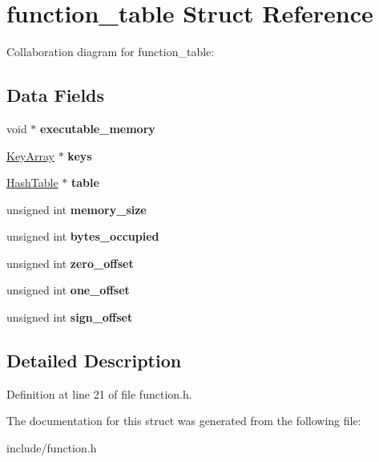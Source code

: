 \hypertarget{structfunction__table}{}\section{function\+\_\+table Struct Reference}
\label{structfunction__table}


Collaboration diagram for function\+\_\+table\+:
\subsection*{Data Fields}
\begin{DoxyCompactItemize}
\item 
\mbox{\label{structfunction__table_a8bfee5e5eec023c38c1fb649f9ffe707}} 
void $\ast$ {\bfseries executable\+\_\+memory}
\item 
\mbox{\label{structfunction__table_aa1945e714e7d47802cfd6fa22da22891}} 
\hyperlink{structkey__array}{Key\+Array} $\ast$ {\bfseries keys}
\item 
\mbox{\label{structfunction__table_a04c121d086177c2df0042a160f24a583}} 
\hyperlink{structhash__table}{Hash\+Table} $\ast$ {\bfseries table}
\item 
\mbox{\label{structfunction__table_ae342f08a4900e892c72dcd01181de8f9}} 
unsigned int {\bfseries memory\+\_\+size}
\item 
\mbox{\label{structfunction__table_a30b5a8a848c8af31e6304a2af515bcb6}} 
unsigned int {\bfseries bytes\+\_\+occupied}
\item 
\mbox{\label{structfunction__table_a05f02204a5a69c7b493d31b0fc1a34b5}} 
unsigned int {\bfseries zero\+\_\+offset}
\item 
\mbox{\label{structfunction__table_a29c44000113311751c3ddeda7ef9f5e8}} 
unsigned int {\bfseries one\+\_\+offset}
\item 
\mbox{\label{structfunction__table_a08e80decc24c77d631bb4f4a89444a6b}} 
unsigned int {\bfseries sign\+\_\+offset}
\end{DoxyCompactItemize}


\subsection{Detailed Description}


Definition at line 21 of file function.\+h.



The documentation for this struct was generated from the following file\+:\begin{DoxyCompactItemize}
\item 
include/function.\+h\end{DoxyCompactItemize}

